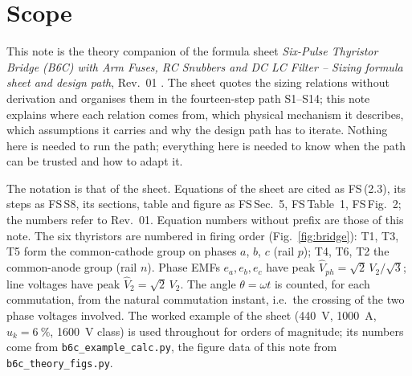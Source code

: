 \documentclass[10pt,a4paper]{scrartcl}
\newcommand{\Vll}{V_{2}}
\newcommand{\uk}{u_{k}}
\newcommand{\fs}[1]{\textsf{FS}\,(#1)}
\newcommand{\fsS}[1]{\textsf{FS}\,#1}
\newcommand{\fssec}[1]{\textsf{FS}\,Sec.~#1}
\newcommand{\fstab}[1]{\textsf{FS}\,Table~#1}
\newcommand{\fsfig}[1]{\textsf{FS}\,Fig.~#1}
\begin{document}

\tableofcontents
\newpage

\section*{Scope}
This note is the theory companion of the formula sheet \emph{Six-Pulse Thyristor Bridge (B6C) with Arm Fuses, RC Snubbers and DC LC Filter -- Sizing formula sheet and design path}, Rev.~01 \cite{fs}. The sheet quotes the sizing relations without derivation and organises them in the fourteen-step path S1--S14; this note explains where each relation comes from, which physical mechanism it describes, which assumptions it carries and why the design path has to iterate. Nothing here is needed to run the path; everything here is needed to know when the path can be trusted and how to adapt it.

The notation is that of the sheet. Equations of the sheet are cited as \fs{2.3}, its steps as \fsS{S8}, its sections, table and figure as \fssec{5}, \fstab{1}, \fsfig{2}; the numbers refer to Rev.~01. Equation numbers without prefix are those of this note. The six thyristors are numbered in firing order (Fig.~\ref{fig:bridge}): T1, T3, T5 form the common-cathode group on phases $a$, $b$, $c$ (rail $p$); T4, T6, T2 the common-anode group (rail $n$). Phase EMFs $e_a, e_b, e_c$ have peak $\hat V_{ph} = \sqrt2\,\Vll/\sqrt3$; line voltages have peak $\hat V_2 = \sqrt2\,\Vll$. The angle $\theta = \omega t$ is counted, for each commutation, from the natural commutation instant, i.e.\ the crossing of the two phase voltages involved. The worked example of the sheet (\SI{440}{V}, \SI{1000}{A}, $\uk = \SI{6}{\percent}$, \SI{1600}{V} class) is used throughout for orders of magnitude; its numbers come from \texttt{b6c\_example\_calc.py}, the figure data of this note from \texttt{b6c\_theory\_figs.py}.
\end{document}
